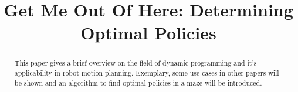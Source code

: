 \documentclass[conference]{IEEEtran}
\begin{document}


%
\title{Get Me Out Of Here: Determining Optimal Policies}


\author{
}





\maketitle

\begin{abstract}
This paper gives a brief overview on the field of dynamic programming and it's applicability in robot motion planning. Exemplary, some use cases in other papers will be shown and an algorithm to find optimal policies in a maze will be introduced.
\end{abstract}





%
\IEEEpeerreviewmaketitle
\end{document}
